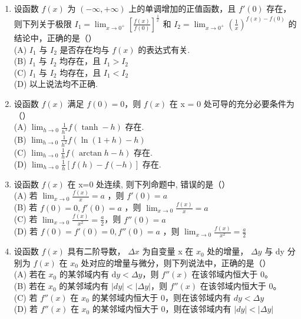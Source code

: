 \documentclass[12pt, a4paper]{ctexart}
\begin{document}
\begin{enumerate}
    \item 设函数 $ f(x) $ 为 $ (-\infty, +\infty) $ 上的单调增加的正值函数，且 $ f'(0) $ 存在，则下列关于极限 $ I_{1} = \lim_{x \to 0^+} \left[ \frac{f(x)}{f(0)} \right]^{\frac{1}{x}} $ 和 $ I_{2} = \lim_{x \to 0^+} \left( \frac{1}{x} \right)^{f(x) - f(0)} $ 的结论中，正确的是（）\\
    (A) $ I_{1} $ 与 $ I_{2} $ 是否存在均与 $ f(x) $ 的表达式有关.\\
    (B) $ I_{1} $ 与 $ I_{2} $ 均存在，且 $ I_{1} > I_{2} $\\
    (C) $ I_{1} $ 与 $ I_{2} $ 均存在，且 $ I_{1}<I_{2} $\\
    (D) 以上说法均不正确.

    \item 设函数 $ f(x) $ 满足 $ f(0) = 0 $，则 $ f(x) $ 在 x = 0 处可导的充分必要条件为（）\\
    (A) $ \lim_{h\to0}\frac{1}{h^{3}}f(\tanh-h) $ 存在.\\
    (B) $ \lim_{h\to0}\frac{1}{h^{2}}f\left(\ln(1+h)-h\right) $\\
    (C) $ \lim_{h\to0}\frac{1}{h}f\left(\arctan h-h\right) $ 存在.\\
    (D) $ \lim_{h\to0}\frac{1}{h}\left[f(h)-f(-h)\right] $ 存在.

    \item 设函数 $ f(x) $ 在 x=0 处连续, 则下列命题中, 错误的是（）\\
    (A) 若 $ \lim_{x\to0}\frac{f(x)}{x}=a $ ，则 $ f'(0)=a $\\
    (B) 若 $ f(0)=0, f'(0)=a $ ，则 $ \lim_{x\to0}\frac{f(x)}{x}=a $\\
    (C) 若 $ \lim_{x\to0}\frac{f(x)}{x^{2}}=\frac{a}{2} $，则 $ f''(0)=a $\\
    (D) 若 $ f(0)=f'(0)=0, f''(0)=a $ ，则 $ \lim_{x\to0}\frac{f(x)}{x^{2}}=\frac{a}{2} $

    \item 设函数 $ f(x) $ 具有二阶导数， $ \Delta x $ 为自变量 x 在 $ x_{0} $ 处的增量， $ \Delta y $ 与 dy 分别为 $ f(x) $ 在 $ x_{0} $ 处对应的增量与微分，则下列说法中，正确的是（）\\
    (A) 若在 $ x_{0} $ 的某邻域内有 $ \mathrm{d}y < \Delta y $，则 $ f''(x) $ 在该邻域内恒大于 0。\\
    (B) 若在 $ x_{0} $ 的某邻域内有 $ |dy| < |\Delta y| $，则 $ f''(x) $ 在该邻域内恒大于 0。\\
    (C) 若 $ f''(x) $ 在 $ x_{0} $ 的某邻域内恒大于 0，则在该邻域内有 $ dy < \Delta y $\\
    (D) 若 $ f''(x) $ 在 $ x_0 $ 的某邻域内恒大于 0，则在该邻域内有 $ |dy| < |\Delta y| $


\end{enumerate}
\end{document}
